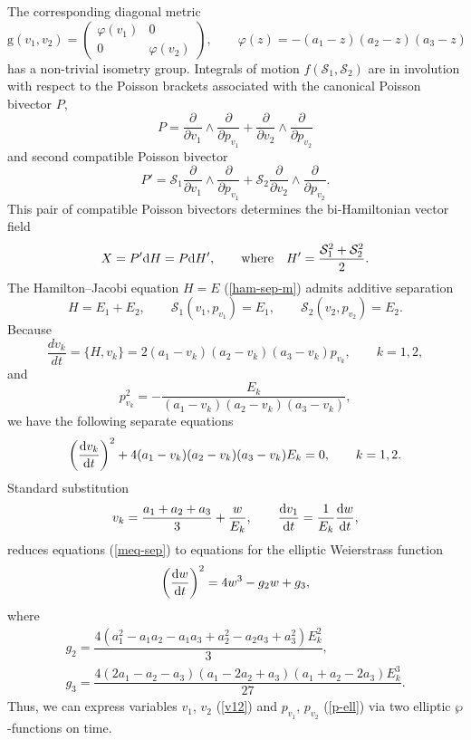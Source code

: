 \documentclass[10pt,a4paper]{amsart}
\numberwithin{equation}{section}
\begin{document}
The corresponding diagonal metric
\begin{equation}\label{varphi}
\mathrm g(v_1,v_2)=\left(
 \begin{matrix}
 \varphi( v_1) & 0 \\
 0 & \varphi(v_2)
 \end{matrix}
 \right) ,\qquad \varphi(z)=-(a_1-z)(a_2-z)(a_3-z)
\end{equation}
has a non-trivial isometry group. Integrals of motion $f(\mathcal{S}_1,\mathcal{S}_2)$ are in involution with respect to the Poisson brackets associated with the canonical Poisson bivector $P$,
\begin{equation}\label{p1}
P=\dfrac{\partial}{\partial v_1}\wedge\frac{\partial}{\partial p_{v_1}}+\dfrac{\partial}{\partial v_2}\wedge\frac{\partial}{\partial p_{v_2}}
\end{equation}
 and second compatible Poisson bivector
 \begin{equation}\label{p2}
P'=\mathcal{S}_1 \dfrac{\partial}{\partial v_1}\wedge\frac{\partial}{\partial p_{v_1}}+\mathcal{S}_2 \dfrac{\partial}{\partial v_2}\wedge\frac{\partial}{\partial p_{v_2}} .
\end{equation}
This pair of compatible Poisson bivectors determines the bi-Hamiltonian vector field
\[
X=P'{\rm d}H=P{\rm d}H' ,\qquad\text{where}\quad H'=\frac{\mathcal{S}_1^2+\mathcal{S}_2^2}{2} .
\]
The Hamilton--Jacobi equation $H=E$ (\ref{ham-sep-m}) admits additive separation
\[
H=E_1+E_2 ,\qquad \mathcal{S}_1(v_1,p_{v_1})=E_1, \qquad \mathcal{S}_2(v_2,p_{v_2})=E_2 .
\]
Because
\begin{equation}\label{meq-sep}
\dfrac{d{v}_k}{dt}=\{H,v_k\}=2(a_1 - v_k)(a_2 - v_k)(a_3 - v_k)p_{v_k} ,\qquad k=1,2,
\end{equation}
and
\begin{equation}\label{p-ell}
p_{v_k}^2=-\frac{E_k}{(a_1 - v_k)(a_2 - v_k)(a_3 - v_k)} ,
\end{equation}
we have the following separate equations
\begin{equation}\label{sep-flow}
\left(\dfrac{{\rm d}{v}_k}{{\rm d}t}\right)^2+4(a_1 - v_k)(a_2 - v_k)(a_3 - v_k)E_k=0 ,\qquad k=1,2.
\end{equation}
Standard substitution
\begin{equation}\label{v12}
v_{k}=\dfrac{a_1+a_2+a_3}{3} +\dfrac{w}{E_k} ,\qquad \dfrac{{\rm d}v_1}{{\rm d}t}=\dfrac{1}{E_k}\dfrac{{\rm d}w}{{\rm d}t} ,
\end{equation}
reduces equations (\ref{meq-sep}) to equations for the elliptic Weierstrass function
\[
\left(\frac{{\rm d}w}{{\rm d}t}\right)^2=4w^3-g_2w+g_3 ,
\]
where
\begin{gather*}
g_2=\dfrac{4(a_1^2 - a_1a_2 - a_1a_3 + a_2^2 - a_2a_3 + a_3^2)E_k^2}{3} ,\\
g_3=\dfrac{4(2a_1 - a_2 - a_3)(a_1 -2 a_2+a_3)(a_1 +a_2 -2 a_3)E_k^3}{27} .
\end{gather*}
Thus, we can express variables $v_{1}$, $v_{2}$ (\ref{v12}) and $p_{v_1}$, $p_{v_2}$ (\ref{p-ell}) via two elliptic $\wp$-functions on time.
\end{document}
